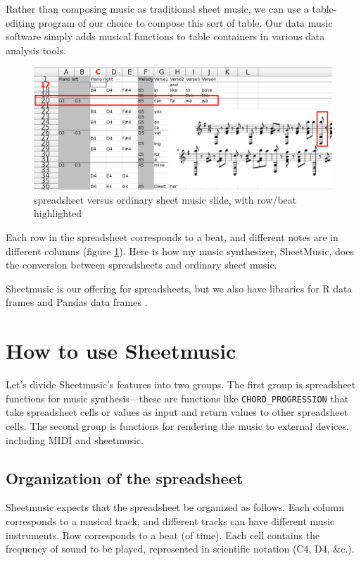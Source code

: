 \documentclass{acm_proc_article-sp}
\begin{document}
Rather than composing music as traditional sheet music,
we can use a table-editing program of our choice to compose
this sort of table. Our data music software simply adds
musical functions to table containers in various data analysis
tools.

\begin{figure} \label{highlight}
\centering
\caption{spreadsheet versus ordinary sheet music slide, with row/beat highlighted}
\includegraphics[width=\textwidth]{../sheetmusic/sheetmusic-side-by-side-highlighted-rowbeat.png}
\end{figure}

Each row in the spreadsheet corresponds to a beat,
and different notes are in different columns (figure \ref{highlight}).
Here is how my music synthesizer, SheetMusic, does the conversion
between spreadsheets and ordinary sheet music.

Sheetmusic is our offering for spreadsheets, but we
also have libraries for R data frames \cite{ddr} and Pandas
data frames \cite{ddpy}.

\section{How to use Sheetmusic}
Let's divide Sheetmusic's features into two groups. The first group
is spreadsheet functions for music synthesis---these are functions
like \texttt{CHORD\_PROGRESSION} that take spreadsheet cells or values
as input and return values to other spreadsheet cells. The second
group is functions for rendering the music to external devices,
including MIDI and sheetmusic.

\subsection{Organization of the spreadsheet}
Sheetmusic expects that the spreadsheet be organized as follows.
Each column corresponds
to a musical track, and different tracks can have different music instruments.
Row corresponds to a beat (of time).
Each cell contains the frequency of sound to be played, represented
in scientific notation (C4, D4, \&c.).
\end{document}

